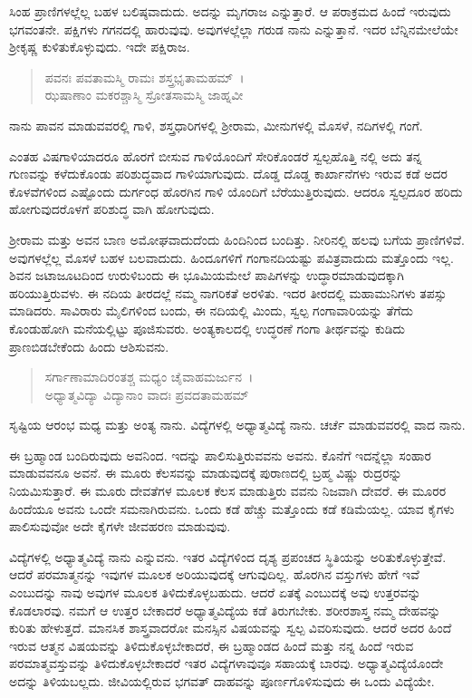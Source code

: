 ಸಿಂಹ ಪ್ರಾಣಿಗಳಲ್ಲೆಲ್ಲ ಬಹಳ ಬಲಿಷ್ಠವಾದುದು. ಅದನ್ನು ಮೃಗರಾಜ ಎನ್ನುತ್ತಾರೆ. ಆ ಪರಾಕ್ರಮದ ಹಿಂದೆ ಇರುವುದು ಭಗವಂತನೇ. ಪಕ್ಷಿಗಳು ಗಗನದಲ್ಲಿ ಹಾರುವುವು. ಅವುಗಳಲ್ಲೆಲ್ಲಾ ಗರುಡ ನಾನು ಎನ್ನುತ್ತಾನೆ. ಇದರ ಬೆನ್ನಿನಮೇಲೆಯೇ ಶ‍್ರೀಕೃಷ್ಣ ಕುಳಿತುಕೊಳ್ಳುವುದು. ಇದೇ ಪಕ್ಷಿರಾಜ.

\begin{verse}
ಪವನಃ ಪವತಾಮಸ್ಮಿ ರಾಮಃ ಶಸ್ತ್ರಭೃತಾಮಹಮ್~।\\ಝಷಾಣಾಂ ಮಕರಶ್ಚಾಸ್ಮಿ ಸ್ರೋತಸಾಮಸ್ಮಿ ಜಾಹ್ನವೀ 
\end{verse}

{\small ನಾನು ಪಾವನ ಮಾಡುವವರಲ್ಲಿ ಗಾಳಿ, ಶಸ್ತ್ರಧಾರಿಗಳಲ್ಲಿ ಶ‍್ರೀರಾಮ, ಮೀನುಗಳಲ್ಲಿ ಮೊಸಳೆ, ನದಿಗಳಲ್ಲಿ ಗಂಗೆ.}

ಎಂತಹ ವಿಷಗಾಳಿಯಾದರೂ ಹೊರಗೆ ಬೀಸುವ ಗಾಳಿಯೊಂದಿಗೆ ಸೇರಿಕೊಂಡರೆ ಸ್ವಲ್ಪಹೊತ್ತಿ ನಲ್ಲಿ ಅದು ತನ್ನ ಗುಣವನ್ನು ಕಳೆದುಕೊಂಡು ಪರಿಶುದ್ಧವಾದ ಗಾಳಿಯಾಗುವುದು. ದೊಡ್ಡ ದೊಡ್ಡ ಕಾರ್ಖಾನೆಗಳು ಇರುವ ಕಡೆ ಅದರ ಕೊಳವೆಗಳಿಂದ ಎಷ್ಟೊಂದು ದುರ್ಗಂಧ ಹೊರಗಿನ ಗಾಳಿ ಯೊಂದಿಗೆ ಬೆರೆಯುತ್ತಿರುವುದು. ಆದರೂ ಸ್ವಲ್ಪದೂರ ಹರಿದು ಹೋಗುವುದರೊಳಗೆ ಪರಿಶುದ್ಧ ವಾಗಿ ಹೋಗುವುದು.

ಶ‍್ರೀರಾಮ ಮತ್ತು ಅವನ ಬಾಣ ಅಮೋಘವಾದುದೆಂದು ಹಿಂದಿನಿಂದ ಬಂದಿತ್ತು. ನೀರಿನಲ್ಲಿ ಹಲವು ಬಗೆಯ ಪ್ರಾಣಿಗಳಿವೆ. ಅವುಗಳಲ್ಲೆಲ್ಲ ಮೊಸಳೆ ಬಹಳ ಬಲವಾದುದು. ಹಿಂದೂಗಳಿಗೆ ಗಂಗಾನದಿಯಷ್ಟು ಪವಿತ್ರವಾದುದು ಮತ್ತೊಂದು ಇಲ್ಲ. ಶಿವನ ಜಟಾಜೂಟದಿಂದ ಉರುಳಿಬಂದು ಈ ಭೂಮಿಯಮೇಲೆ ಪಾಪಿಗಳನ್ನು ಉದ್ಧಾರಮಾಡುವುದಕ್ಕಾಗಿ ಹರಿಯುತ್ತಿರುವಳು. ಈ ನದಿಯ ತೀರದಲ್ಲೆ ನಮ್ಮ ನಾಗರಿಕತೆ ಅರಳಿತು. ಇದರ ತೀರದಲ್ಲಿ ಮಹಾಮುನಿಗಳು ತಪಸ್ಸು ಮಾಡಿದರು. ಸಾವಿರಾರು ಮೈಲಿಗಳಿಂದ ಬಂದು, ಈ ನದಿಯಲ್ಲಿ ಮಿಂದು, ಸ್ವಲ್ಪ ಗಂಗಾವಾರಿಯನ್ನು ತೆಗೆದು ಕೊಂಡುಹೋಗಿ ಮನೆಯಲ್ಲಿಟ್ಟು ಪೂಜಿಸುವರು. ಅಂತ್ಯಕಾಲದಲ್ಲಿ ಉದ್ಧರಣೆ ಗಂಗಾ ತೀರ್ಥವನ್ನು ಕುಡಿದು ಪ್ರಾಣಬಿಡಬೇಕೆಂದು ಹಿಂದು ಆಶಿಸುವನು.

\begin{verse}
ಸರ್ಗಾಣಾಮಾದಿರಂತಶ್ಚ ಮಧ್ಯಂ ಚೈವಾಹಮರ್ಜುನ~।\\ಅಧ್ಯಾತ್ಮವಿದ್ಯಾ ವಿದ್ಯಾನಾಂ ವಾದಃ ಪ್ರವದತಾಮಹಮ್ 
\end{verse}

{\small ಸೃಷ್ಟಿಯ ಆರಂಭ ಮಧ್ಯ ಮತ್ತು ಅಂತ್ಯ ನಾನು. ವಿದ್ಯೆಗಳಲ್ಲಿ ಅಧ್ಯಾತ್ಮವಿದ್ಯೆ ನಾನು. ಚರ್ಚೆ ಮಾಡುವವರಲ್ಲಿ ವಾದ ನಾನು.}

ಈ ಬ್ರಹ್ಮಾಂಡ ಬಂದಿರುವುದು ಅವನಿಂದ. ಇದನ್ನು ಪಾಲಿಸುತ್ತಿರುವವನು ಅವನು. ಕೊನೆಗೆ ಇದನ್ನೆಲ್ಲಾ ಸಂಹಾರ ಮಾಡುವವನೂ ಅವನೆ. ಈ ಮೂರು ಕೆಲಸವನ್ನು ಮಾಡುವುದಕ್ಕೆ ಪುರಾಣದಲ್ಲಿ ಬ್ರಹ್ಮ ವಿಷ್ಣು ರುದ್ರರನ್ನು ನಿಯಮಿಸುತ್ತಾರೆ. ಈ ಮೂರು ದೇವತೆಗಳ ಮೂಲಕ ಕೆಲಸ ಮಾಡುತ್ತಿರು ವವನು ನಿಜವಾಗಿ ದೇವರೆ. ಈ ಮೂರರ ಹಿಂದೆಯೂ ಅವನು ಒಂದೇ ಸಮನಾಗಿರುವನು. ಒಂದು ಕಡೆ ಹೆಚ್ಚು ಮತ್ತೊಂದು ಕಡೆ ಕಡಿಮೆಯಲ್ಲ. ಯಾವ ಕೈಗಳು ಪಾಲಿಸುವುವೋ ಅದೇ ಕೈಗಳೇ ಜೀವಹರಣ ಮಾಡುವುವು.

ವಿದ್ಯೆಗಳಲ್ಲಿ ಅಧ್ಯಾತ್ಮವಿದ್ಯೆ ನಾನು ಎನ್ನುವನು. ಇತರ ವಿದ್ಯೆಗಳಿಂದ ದೃಶ್ಯ ಪ್ರಪಂಚದ ಸ್ಥಿತಿಯನ್ನು ಅರಿತುಕೊಳ್ಳುತ್ತೇವೆ. ಆದರೆ ಪರಮಾತ್ಮನನ್ನು ಇವುಗಳ ಮೂಲಕ ಅರಿಯುವುದಕ್ಕೆ ಆಗುವುದಿಲ್ಲ. ಹೊರಗಿನ ವಸ್ತುಗಳು ಹೇಗೆ ಇವೆ ಎಂಬುದನ್ನು ನಾವು ಅವುಗಳ ಮೂಲಕ ತಿಳಿದುಕೊಳ್ಳಬಹುದು. ಆದರೆ ಏತಕ್ಕೆ ಎಂಬುದಕ್ಕೆ ಅವು ಉತ್ತರವನ್ನು ಕೊಡಲಾರವು. ನಮಗೆ ಆ ಉತ್ತರ ಬೇಕಾದರೆ ಅಧ್ಯಾತ್ಮವಿದ್ಯೆಯ ಕಡೆ ತಿರುಗಬೇಕು. ಶರೀರಶಾಸ್ತ್ರ ನಮ್ಮ ದೇಹವನ್ನು ಕುರಿತು ಹೇಳುತ್ತದೆ. ಮಾನಸಿಕ ಶಾಸ್ತ್ರವಾದರೋ ಮನಸ್ಸಿನ ವಿಷಯವನ್ನು ಸ್ವಲ್ಪ ವಿವರಿಸುವುದು. ಆದರೆ ಅದರ ಹಿಂದೆ ಇರುವ ಆತ್ಮನ ವಿಷಯವನ್ನು ತಿಳಿದುಕೊಳ್ಳಬೇಕಾದರೆ, ಈ ಬ್ರಹ್ಮಾಂಡದ ಹಿಂದೆ ಮತ್ತು ನನ್ನ ಹಿಂದೆ ಇರುವ ಪರಮಾತ್ಮವಸ್ತುವನ್ನು ತಿಳಿದುಕೊಳ್ಳಬೇಕಾದರೆ ಇತರ ವಿದ್ಯೆಗಳಾವುವೂ ಸಹಾಯಕ್ಕೆ ಬಾರವು. ಅಧ್ಯಾತ್ಮವಿದ್ಯೆಯೊಂದೇ ಅದನ್ನು ತಿಳಿಯಬಲ್ಲದು. ಜೀವಿಯಲ್ಲಿರುವ ಭಗವತ್ ದಾಹವನ್ನು ಪೂರ್ಣಗೊಳಿಸುವುದು ಈ ಒಂದು ವಿದ್ಯೆಯೇ.

